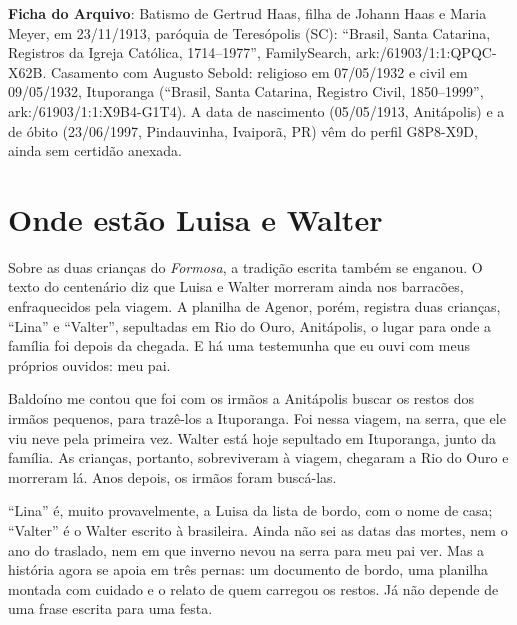 \documentclass[
  brazilian,
  11pt,
  openany]{book}
\begin{document}
\begin{ficha}

\textbf{Ficha do Arquivo}: Batismo de Gertrud Haas, filha de Johann Haas
e Maria Meyer, em 23/11/1913, paróquia de Teresópolis (SC): ``Brasil,
Santa Catarina, Registros da Igreja Católica, 1714--1977'',
FamilySearch, ark:/61903/1:1:QPQC-X62B. Casamento com Augusto Sebold:
religioso em 07/05/1932 e civil em 09/05/1932, Ituporanga (``Brasil,
Santa Catarina, Registro Civil, 1850--1999'', ark:/61903/1:1:X9B4-G1T4).
A data de nascimento (05/05/1913, Anitápolis) e a de óbito (23/06/1997,
Pindauvinha, Ivaiporã, PR) vêm do perfil G8P8-X9D, ainda sem certidão
anexada.

\end{ficha}

\section{Onde estão Luisa e Walter}\label{onde-estuxe3o-luisa-e-walter}

Sobre as duas crianças do \emph{Formosa}, a tradição escrita também se
enganou. O texto do centenário diz que Luisa e Walter morreram ainda nos
barracões, enfraquecidos pela viagem. A planilha de Agenor, porém,
registra duas crianças, ``Lina'' e ``Valter'', sepultadas em Rio do
Ouro, Anitápolis, o lugar para onde a família foi depois da chegada. E
há uma testemunha que eu ouvi com meus próprios ouvidos: meu pai.

Baldoíno me contou que foi com os irmãos a Anitápolis buscar os restos
dos irmãos pequenos, para trazê-los a Ituporanga. Foi nessa viagem, na
serra, que ele viu neve pela primeira vez. Walter está hoje sepultado em
Ituporanga, junto da família. As crianças, portanto, sobreviveram à
viagem, chegaram a Rio do Ouro e morreram lá. Anos depois, os irmãos
foram buscá-las.

``Lina'' é, muito provavelmente, a Luisa da lista de bordo, com o nome
de casa; ``Valter'' é o Walter escrito à brasileira. Ainda não sei as
datas das mortes, nem o ano do traslado, nem em que inverno nevou na
serra para meu pai ver. Mas a história agora se apoia em três pernas: um
documento de bordo, uma planilha montada com cuidado e o relato de quem
carregou os restos. Já não depende de uma frase escrita para uma festa.
\end{document}
